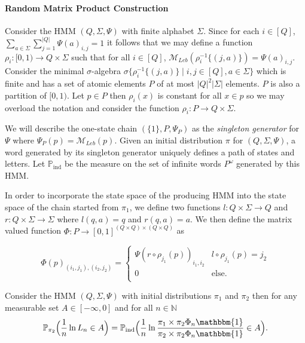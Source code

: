 \documentclass[a4paper,UKenglish,cleveref, autoref,mathscr]{lipics-v2019}
\newcommand{\NN}{\mathbb{N}}
\newcommand{\PP}{\mathbb{P}}
\newcommand{\MM}{\mathscr{M}}
\newcommand{\1}{\mathbbm{1}}
\newcommand{\MLeb}{\MM_{\mathit{Leb}}}
\newcommand{\PPind}{\PP_{\text{ind}}}
\begin{document}
\paragraph{Random Matrix Product Construction\\}
Consider the HMM $(Q, \Sigma, \Psi)$ with finite alphabet $\Sigma$. Since for each $i \in [Q]$, $\sum_{a \in \Sigma} \sum_{j = 1}^{|Q|} \Psi(a)_{i,j} = 1$ it follows that we may define a function $\rho_i : [0,1) \rightarrow Q \times \Sigma$ such that for all $i \in [Q]$, $\MLeb(\rho_i^{-1}\{(j, a)\}) = \Psi(a)_{i,j}$. Consider the minimal $\sigma$-algebra $\sigma\{\rho_i^{-1}\{(j, a)\} \mid i,j \in [Q], a \in \Sigma\}$ which is finite and has a set of atomic elements $P$ of at most $|Q|^2|\Sigma|$ elements. $P$ is also a partition of $[0,1)$. Let $p \in P$ then $\rho_i(x)$ is constant for all $x \in p$ so we may overload the notation and consider the function $\rho_i : P \rightarrow Q \times \Sigma$. 

We will describe the one-state chain $(\{1\}, P, \Psi_P)$ as the \emph{singleton generator} for $\Psi$ where $\Psi_P(p) = \MLeb(p)$. Given an initial distribution $\pi$ for $(Q, \Sigma, \Psi)$, a word generated by its singleton generator uniquely defines a path of states and letters. Let $\PPind$ be the measure on the set of infinite words $P^\omega$ generated by this HMM.

In order to incorporate the state space of the producing HMM into the state space of the chain started from $\pi_1$, we define two functions $l : Q \times \Sigma \rightarrow Q$ and $r : Q \times \Sigma \rightarrow \Sigma$ where $l(q,a) = q$ and $r(q,a) = a$. We then define the matrix valued function $\Phi : P \rightarrow [0,1]^{(Q \times Q) \times (Q \times Q)}$ as 

\[\Phi(p)_{(i_1,j_1),(i_2,j_2)} = \begin{cases} 
\Psi(r \circ \rho_{j_1}(p) )_{i_1, i_2} & l \circ \rho_{j_1}(p) = j_2 \\
0 & \text{else}. \\
\end{cases}\]

\begin{proposition}\label{existenceoflims}
Consider the HMM $(Q, \Sigma, \Psi)$ with initial distributions $\pi_1$ and $\pi_2$ then for any measurable set $A \in [-\infty, 0]$ and for all $n \in \NN$
\begin{equation*}
\PP_{\pi_2}\Big( \frac1n \ln L_n \in A\Big) = \PPind\Big( \frac1n \ln \frac{\pi_1 \times \pi_2 \Phi_n \1}{\pi_2 \times \pi_2 \Phi_n \1} \in A \Big).
\end{equation*}
\end{proposition}
\end{document}
